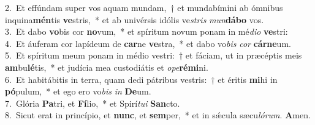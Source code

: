 {2.~}Et effúndam super vos aquam mundam,~† et mundabímini ab ómnibus inquina\textbf{mén}tis \textbf{ve}stris,~* et ab univérsis idólis ve\textit{stris} \textit{mun}\textbf{dá}\textbf{bo} vos.\\
{3.~}Et dabo \textbf{vo}bis cor \textbf{no}vum,~* et spíritum novum ponam in mé\textit{di}\textit{o} \textbf{ve}stri:\\
{4.~}Et áuferam cor lapídeum de \textbf{car}ne \textbf{ve}stra,~* et dabo vo\textit{bis} \textit{cor} \textbf{cár}\textbf{ne}um.\\
{5.~}Et spíritum meum ponam in médio vestri:~† et fáciam, ut in præcéptis meis \textbf{am}bu\textbf{lé}tis,~* et judícia mea custodiátis et \textit{o}\textit{pe}\textbf{ré}\textbf{mi}ni.\\
{6.~}Et habitábitis in terra, quam dedi pátribus vestris:~† et éritis \textbf{mi}hi in \textbf{pó}pulum,~* et ego ero vo\textit{bis} \textit{in} \textbf{De}um.\\
{7.~}Glória \textbf{Pa}tri, et \textbf{Fí}lio,~* et Spirí\textit{tu}\textit{i} \textbf{San}cto.\\
{8.~}Sicut erat in princípio, et \textbf{nunc}, et \textbf{sem}per,~* et in sǽcula sæcu\textit{ló}\textit{rum}. \textbf{A}men.\\
